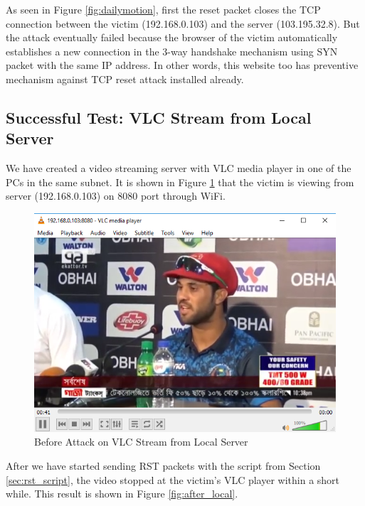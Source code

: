 \documentclass[14pt]{extarticle}
\begin{document}
        As seen in Figure \ref{fig:dailymotion}, first the reset packet closes the TCP connection between the victim (192.168.0.103) and the server (103.195.32.8). But the attack eventually failed because the browser of the victim automatically establishes a new connection in the 3-way handshake mechanism using SYN packet with the same IP address. In other words, this website too has preventive mechanism against TCP reset attack installed already.
        
    \subsection{Successful Test: VLC Stream from Local Server}
        We have created a video streaming server with VLC media player in one of the PCs in the same subnet. It is shown in Figure \ref{fig:before_local} that the victim is viewing from server (192.168.0.103) on 8080 port through WiFi.
        
        \begin{figure}[!h]
            \centering
            \includegraphics[width=.95\textwidth]{Pictures/RST_Local/before.PNG}
            \caption{Before Attack on VLC Stream from Local Server}
            \label{fig:before_local}
        \end{figure}
        
        After we have started sending RST packets with the script from Section \ref{sec:rst_script}, the video stopped at the victim's VLC player within a short while. This result is shown in Figure \ref{fig:after_local}.
        
\end{document}

